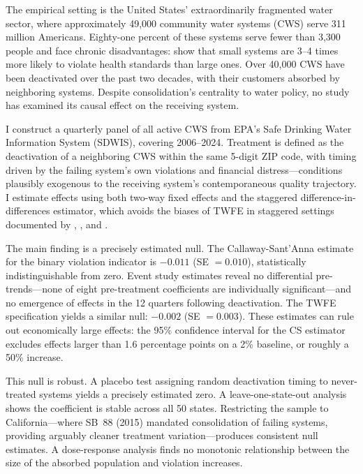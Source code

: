 \documentclass[12pt]{article}
\begin{document}
The empirical setting is the United States' extraordinarily fragmented water sector, where approximately 49,000 community water systems (CWS) serve 311 million Americans. Eighty-one percent of these systems serve fewer than 3,300 people and face chronic disadvantages: \citet{allaire2018national} show that small systems are 3--4 times more likely to violate health standards than large ones. Over 40,000 CWS have been deactivated over the past two decades, with their customers absorbed by neighboring systems. Despite consolidation's centrality to water policy, no study has examined its causal effect on the receiving system.

I construct a quarterly panel of all active CWS from EPA's Safe Drinking Water Information System (SDWIS), covering 2006--2024. Treatment is defined as the deactivation of a neighboring CWS within the same 5-digit ZIP code, with timing driven by the failing system's own violations and financial distress---conditions plausibly exogenous to the receiving system's contemporaneous quality trajectory. I estimate effects using both two-way fixed effects and the \citet{callaway2021difference} staggered difference-in-differences estimator, which avoids the biases of TWFE in staggered settings documented by \citet{goodman2021difference}, \citet{de_chaisemartin2020two}, and \citet{sun2021estimating}.

The main finding is a precisely estimated null. The Callaway-Sant'Anna estimate for the binary violation indicator is $-0.011$ (SE $= 0.010$), statistically indistinguishable from zero. Event study estimates reveal no differential pre-trends---none of eight pre-treatment coefficients are individually significant---and no emergence of effects in the 12 quarters following deactivation. The TWFE specification yields a similar null: $-0.002$ (SE $= 0.003$). These estimates can rule out economically large effects: the 95\% confidence interval for the CS estimator excludes effects larger than 1.6 percentage points on a 2\% baseline, or roughly a 50\% increase.

This null is robust. A placebo test assigning random deactivation timing to never-treated systems yields a precisely estimated zero. A leave-one-state-out analysis shows the coefficient is stable across all 50 states. Restricting the sample to California---where SB~88 (2015) mandated consolidation of failing systems, providing arguably cleaner treatment variation---produces consistent null estimates. A dose-response analysis finds no monotonic relationship between the size of the absorbed population and violation increases.
\end{document}
